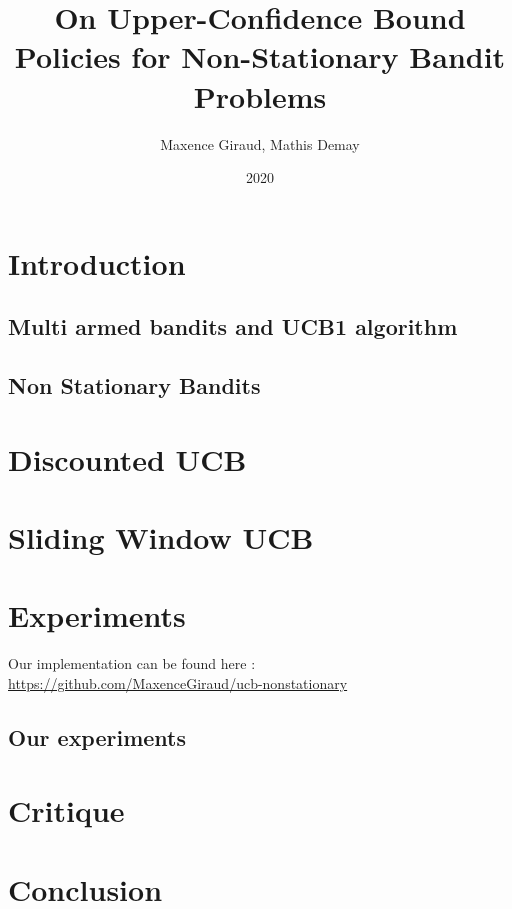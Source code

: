 \documentclass{article}
\title{On Upper-Confidence Bound Policies for Non-Stationary Bandit Problems}
\author{Maxence Giraud, Mathis Demay}
\date{2020}
\begin{document}
\maketitle

\begin{abstract}

	
	
\end{abstract}

\section{Introduction}

	\subsection{Multi armed bandits and UCB1 algorithm}

		

	\subsection{Non Stationary Bandits}

		

\section{Discounted UCB}
	

\section{Sliding Window UCB}

	

\section{Experiments} \label{sec_expes}

Our implementation can be found here : \url{https://github.com/MaxenceGiraud/ucb-nonstationary} 
	
	\subsection{Our experiments}
	
		

\section{Critique}
	
	

\section{Conclusion}

	


\end{document}
